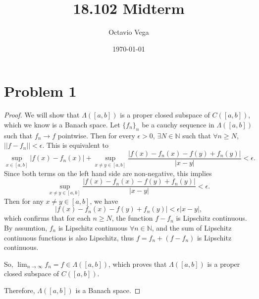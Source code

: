 \documentclass{article}
\title{18.102 Midterm}
\author{Octavio Vega}
\date\today
\newcommand{\N}{\mathbb{N}} %
\begin{document}
\maketitle
	
\section*{Problem 1}
\begin{proof}
	We will show that $\Lambda([a, b])$ is a proper closed subspace of $C([a, b])$, which we know is a Banach space.
	Let $\{f_n\}_n$ be a cauchy sequence in $\Lambda([a, b])$ such that $f_n \to f$ pointwise. Then for every $\epsilon > 0$, $\exists N \in \N$ such that $\forall n \geq N$, $||f - f_n|| < \epsilon$. This is equivalent to
	\begin{equation}
		\sup_{x \in [a, b]} |f(x) - f_n(x)| + \sup_{x \neq y \in [a, b]}\frac{|f(x) - f_n(x) - f(y) + f_n(y)|}{|x-y|} < \epsilon.
	\end{equation}
	Since both terms on the left hand side are non-negative, this implies
	\begin{equation}
		\sup_{x \neq y \in [a, b]}\frac{|f(x) - f_n(x) - f(y) + f_n(y)|}{|x-y|} < \epsilon.
	\end{equation}
	Then for any $x \neq y \in [a, b]$, we have
	\begin{equation}
		|f(x) - f_n(x) - f(y) + f_n(y)| < \epsilon|x-y|,
	\end{equation}
	which confirms that for each $n \geq N$, the function $f - f_n$ is Lipschitz continuous. By assumtion, $f_n$ is Lipschitz continuous $\forall n \in \N$, and the sum of Lipschitz continuous functions is also Lipschitz, thus $f = f_n + (f - f_n)$ is Lipschitz continuous.
	
	So, $\lim_{n \to \infty}f_n = f \in \Lambda([a, b])$, which proves that $\Lambda([a, b])$ is a proper closed subspace of $C([a, b])$.
	
	Therefore, $\Lambda([a, b])$ is a Banach space.  
\end{proof}
\end{document}
